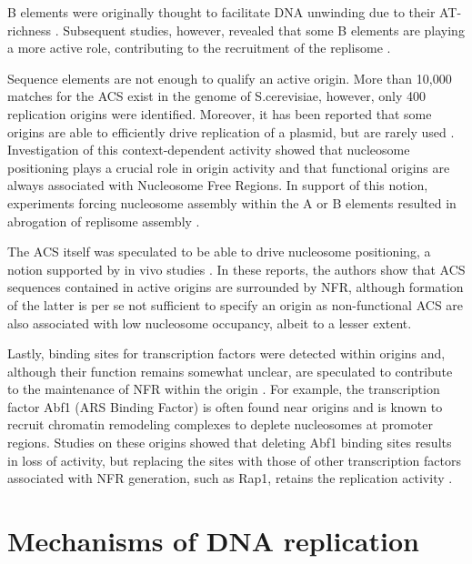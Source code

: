 B elements were originally thought to facilitate DNA unwinding due to their AT-richness \cite{huang:1993:dna}. Subsequent studies, however, revealed that some B elements are playing a more active role, contributing to the recruitment of the replisome \cite{wilmes:2002:b2}.


\vspace{5mm}

Sequence elements are not enough to qualify an active origin. 
More than 10,000 matches for the ACS exist in the genome of S.cerevisiae, however, only 400 replication origins were identified. 
Moreover, it has been reported that some origins are able to efficiently drive replication of a plasmid, but are rarely used \invivo{} \cite{newlon:1993:analysis, santocanale:1999:activation}. 
Investigation of this context-dependent activity showed that nucleosome positioning plays a crucial role in origin activity and that functional origins are always associated with Nucleosome Free Regions. 
In support of this notion, experiments forcing nucleosome assembly within the A or B elements resulted in abrogation of replisome assembly \cite{lipford:2001:nucleosomes}. 


The ACS itself was speculated to be able to drive nucleosome positioning, a notion supported by in vivo studies \cite{eaton:2010:conserved, berbenetz:2010:diversity}.
In these reports, the authors show that ACS sequences contained in active origins are surrounded by NFR, although formation of the latter is per se not sufficient to specify an origin as non-functional ACS are also associated with low nucleosome occupancy, albeit to a lesser extent.


Lastly, binding sites for transcription factors were detected within origins and, although their function remains somewhat unclear, are speculated to contribute to the maintenance of NFR within the origin \cite{diffley:1992:proteindna, rhode:1989:gene}. 
For example, the transcription factor Abf1 (ARS Binding Factor) is often found near origins and is known to recruit chromatin remodeling complexes to deplete nucleosomes at promoter regions. 
Studies on these origins showed that deleting Abf1 binding sites results in loss of activity, but replacing the sites with those of other transcription factors associated with NFR generation, such as Rap1, retains the replication activity \cite{marahrens:1992:yeast}.


\section{Mechanisms of DNA replication}

